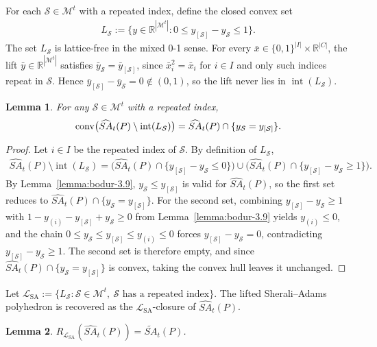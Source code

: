 \documentclass{article}
\newtheorem{lemma}{Lemma}
\newcommand{\R}{\mathbb{R}}
\newcommand{\M}{\mathcal{M}}
\renewcommand{\S}{\mathcal{S}}
\renewcommand{\L}{\mathcal{L}}
\begin{document}
For each $\S \in \M^t$ with a repeated index, define the closed convex set
\begin{align}
    L_\S := \{y \in \R^{|\M^t|} : 0 \leq y_{[\S]} - y_{\S} \leq 1\}.
\end{align}
The set $L_\S$ is lattice-free in the mixed 0-1 sense. For every $\bar x \in \{0,1\}^{|I|} \times \R^{|C|}$, the lift $\bar y \in \R^{|\M^t|}$  satisfies $\bar y_\S = \bar y_{[\S]}$, since $\bar x_i^2 = \bar x_i$ for $i \in I$ and only such indices repeat in $\S$. Hence $\bar y_{[\S]} - \bar y_\S = 0 \notin (0,1)$, so the lift never lies in $\operatorname{int}(L_\S)$.

\begin{lemma} \label{lemma:sa-strengthen}
    For any $\S \in \M^t$ with a repeated index,
    \begin{align}
        \operatorname{conv}\bigl(\widehat{SA}_t(P) \setminus \operatorname{int}(L_\S)\bigr)
        = \widehat{SA}_t(P) \cap \{y_\S = y_{[\S]}\}. \notag
    \end{align}
\end{lemma}

\begin{proof}
    Let $i \in I$ be the repeated index of $\S$. By definition of $L_\S$,
    \begin{align}
        \widehat{SA}_t(P) \setminus \operatorname{int}(L_\S)
        = \bigl(\widehat{SA}_t(P) \cap \{y_{[\S]} - y_\S \leq 0\}\bigr) \cup \bigl(\widehat{SA}_t(P) \cap \{y_{[\S]} - y_\S \geq 1\}\bigr). \label{sa-disjunction}
    \end{align}
    By Lemma~\ref{lemma:bodur-3.9}, $y_\S \leq y_{[\S]}$ is valid for $\widehat{SA}_t(P)$, so the first set reduces to $\widehat{SA}_t(P) \cap \{y_\S = y_{[\S]}\}$. For the second set, combining $y_{[\S]} - y_\S \geq 1$ with $1 - y_{(i)} - y_{[\S]} + y_\S \geq 0$ from Lemma~\ref{lemma:bodur-3.9} yields $y_{(i)} \leq 0$, and the chain $0 \leq y_\S \leq y_{[\S]} \leq y_{(i)} \leq 0$ forces $y_{[\S]} - y_\S = 0$, contradicting $y_{[\S]} - y_\S \geq 1$. The second set is therefore empty, and since $\widehat{SA}_t(P) \cap \{y_\S = y_{[\S]}\}$ is convex, taking the convex hull leaves it unchanged.
\end{proof}

Let $\L_{\mathrm{SA}} := \{L_\S : \S \in \M^t,\ \S \text{ has a repeated index}\}$. The lifted Sherali--Adams polyhedron is recovered as the $\L_{\mathrm{SA}}$-closure of $\widehat{SA}_t(P)$.

\begin{lemma} \label{lemma:sa-as-L}
    $R_{\L_{\mathrm{SA}}}(\widehat{SA}_t(P)) = \widetilde{SA}_t(P)$.
\end{lemma}
\end{document}
